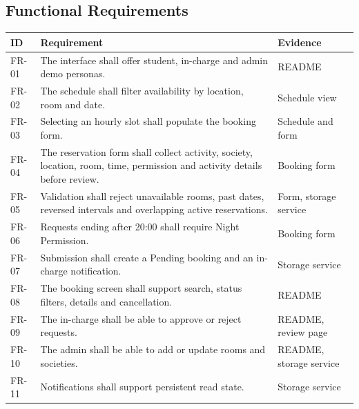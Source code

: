 \documentclass[11pt,a4paper]{report}
\begin{document}
\subsection{Functional Requirements}
\begin{longtable}{@{}p{13mm}p{104mm}p{22mm}@{}}\toprule ID & Requirement & Evidence\\\midrule\endhead
FR-01 & The interface shall offer student, in-charge and admin demo personas. & README\\
FR-02 & The schedule shall filter availability by location, room and date. & Schedule view\\
FR-03 & Selecting an hourly slot shall populate the booking form. & Schedule and form\\
FR-04 & The reservation form shall collect activity, society, location, room, time, permission and activity details before review. & Booking form\\
FR-05 & Validation shall reject unavailable rooms, past dates, reversed intervals and overlapping active reservations. & Form, storage service\\
FR-06 & Requests ending after 20:00 shall require Night Permission. & Booking form\\
FR-07 & Submission shall create a Pending booking and an in-charge notification. & Storage service\\
FR-08 & The booking screen shall support search, status filters, details and cancellation. & README\\
FR-09 & The in-charge shall be able to approve or reject requests. & README, review page\\
FR-10 & The admin shall be able to add or update rooms and societies. & README, storage service\\
FR-11 & Notifications shall support persistent read state. & Storage service\\
\bottomrule\end{longtable}
\clearpage
\end{document}
